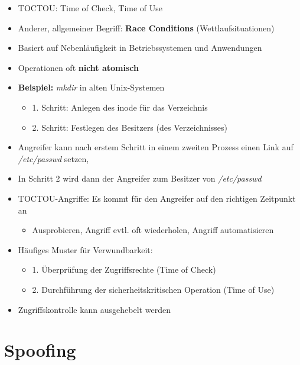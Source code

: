 \documentclass[openany]{book}
\begin{document}
\begin{itemize}
    \item TOCTOU: Time of Check, Time of Use
    \item Anderer, allgemeiner Begriff: \textbf{Race Conditions} (Wettlaufsituationen)
    \item Basiert auf Nebenläufigkeit in Betriebssystemen und Anwendungen
    \item Operationen oft \textbf{nicht atomisch}
    \item \textbf{Beispiel:} \textit{mkdir} in alten Unix-Systemen
    \begin{itemize}
        \item 1. Schritt: Anlegen des inode für das Verzeichnis
        \item 2. Schritt: Festlegen des Besitzers (des Verzeichnisses)
    \end{itemize}
    \item Angreifer kann nach erstem Schritt in einem zweiten Prozess einen Link auf \textit{/etc/passwd} setzen,
    \item In Schritt 2 wird dann der Angreifer zum Besitzer von \textit{/etc/passwd} \\
    \item TOCTOU-Angriffe: Es kommt für den Angreifer auf den richtigen Zeitpunkt an
    \begin{itemize}
        \item Ausprobieren, Angriff evtl. oft wiederholen, Angriff automatisieren
    \end{itemize}
    \item Häufiges Muster für Verwundbarkeit:
    \begin{itemize}
        \item 1. Überprüfung der Zugriffsrechte (Time of Check)
        \item 2. Durchführung der sicherheitskritischen Operation (Time of Use)
    \end{itemize}
    \item Zugriffskontrolle kann ausgehebelt werden
\end{itemize}

\section{Spoofing}
\end{document}
